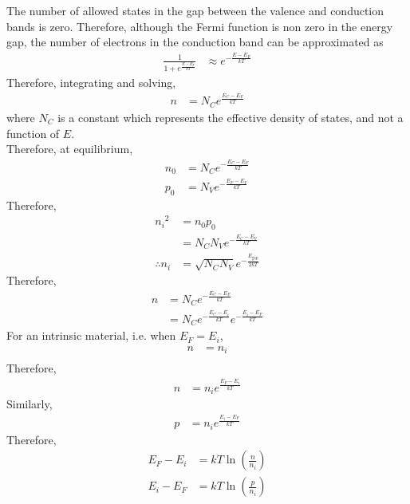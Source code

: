 \documentclass[titlepage, fleqn, a4paper, 12pt, twoside]{article}
\theoremstyle{definition}
\theoremstyle{theorem}
\begin{document}
The number of allowed states in the gap between the valence and conduction bands is zero.
Therefore, although the Fermi function is non zero in the energy gap, the number of electrons in the conduction band can be approximated as
\begin{align*}
	\frac{1}{1 + e^{\frac{E - E_F}{k T}}} & \approx e^{-\frac{E - E_F}{k T}}
\end{align*}
Therefore, integrating and solving,
\begin{align*}
	n & = N_C e^{\frac{E_C - E_F}{k T}}
\end{align*}
where $N_C$ is a constant which represents the effective density of states, and not a function of $E$.\\
Therefore, at equilibrium,
\begin{align*}
	n_0 & = N_C e^{-\frac{E_C - E_F}{k T}} \\
	p_0 & = N_V e^{-\frac{E_F - E_V}{k T}}
\end{align*}
Therefore,
\begin{align*}
	{n_i}^2        & = n_0 p_0                            \\
                       & = N_C N_V e^{-\frac{E_C - E_V}{k T}} \\
	\therefore n_i & = \sqrt{N_C N_V} e^{-\frac{E_{\text{gap}}}{2 k T}}
\end{align*}
Therefore,
\begin{align*}
	n & = N_C e^{-\frac{E_C - E_F}{k T}} \\
          & = N_C e^{-\frac{E_C - E_i}{k T}} e^{-\frac{E_i - E_F}{k T}}
\end{align*}
For an intrinsic material, i.e. when $E_F = E_i$,
\begin{align*}
	n & = n_i \\
\end{align*}
Therefore,
\begin{align*}
	n & = n_i e^{\frac{E_F - E_i}{k T}}
\end{align*}
Similarly,
\begin{align*}
	p & = n_i e^{\frac{E_i - E_F}{k T}}
\end{align*}
Therefore,
\begin{align*}
	E_F - E_i & = k T \ln\left( \frac{n}{n_i} \right) \\
	E_i - E_F & = k T \ln\left( \frac{p}{n_i} \right)
\end{align*}
\end{document}
